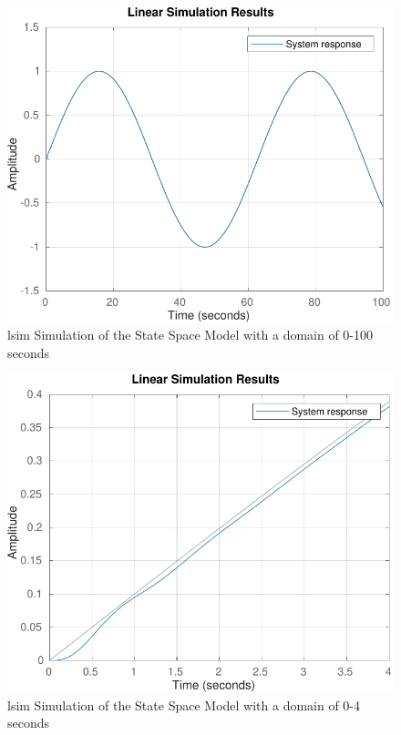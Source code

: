 \documentclass[12pt]{article}
\begin{document}
		\begin{figure}[H]
			\centering
			\includegraphics[width=1\linewidth]{"Code/Fig/lsim_run_100s.pdf"}
			\caption{lsim Simulation of the State Space Model with a domain of 0-100 seconds}
			\label{fig:lsimrun100s}
		\end{figure}
		\begin{figure}[H]
			\centering
			\includegraphics[width=1\linewidth]{"Code/Fig/lsim_run_4s.pdf"}
			\caption{lsim Simulation of the State Space Model with a domain of 0-4 seconds}
			\label{fig:lsimrun4s}
		\end{figure}
\end{document}
